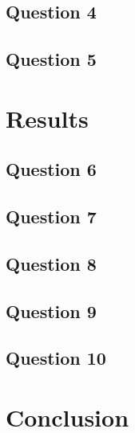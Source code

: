 \documentclass{article}
\begin{document}
\subsection{Question 4}

\subsection{Question 5}

\section{Results}

\subsection{Question 6}

\subsection{Question 7}

\subsection{Question 8}

\subsection{Question 9}

\subsection{Question 10}

\section{Conclusion}
\end{document}
